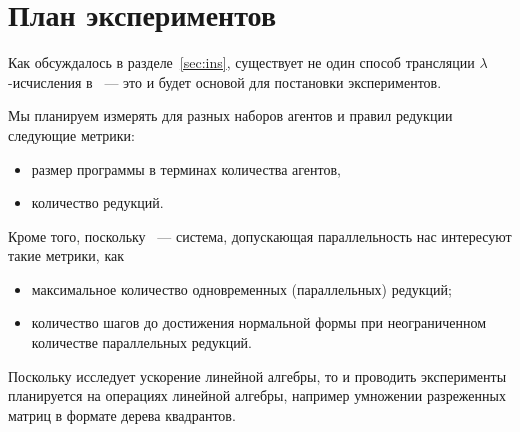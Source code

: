 
\section{План экспериментов}

Как обсуждалось в разделе~\ref{sec:ins}, существует не один способ трансляции $\lambda$-исчисления в \INs{}~--- это и будет основой для постановки экспериментов.

Мы планируем измерять для разных наборов агентов и правил редукции следующие метрики:
\begin{itemize}
    \item размер программы в терминах количества агентов,
    \item количество редукций.
\end{itemize}
Кроме того, поскольку \INs{}~--- система, допускающая параллельность нас интересуют такие метрики, как
\begin{itemize}
    \item максимальное количество одновременных (параллельных) редукций;
    \item количество шагов до достижения нормальной формы при неограниченном количестве параллельных редукций.
\end{itemize}

Поскольку \Lamagraph{} исследует ускорение линейной алгебры, то и проводить эксперименты планируется на операциях линейной алгебры, например умножении разреженных матриц в формате дерева квадрантов.
